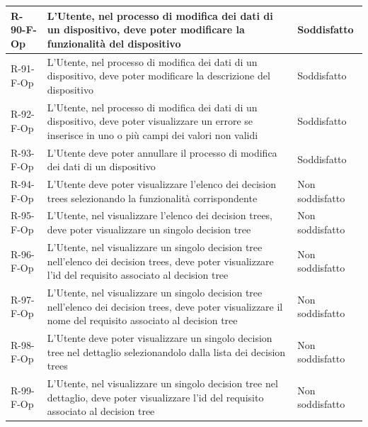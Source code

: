 \documentclass[a4paper,12pt]{article}
\begin{document}
{{\begin{longtable}{|l|p{}|p{}|}
                R-90-F-Op       & L'Utente, nel processo di modifica dei dati di un dispositivo, deve poter modificare la funzionalità del dispositivo                                                                        & Soddisfatto \\ \hline
                R-91-F-Op       & L'Utente, nel processo di modifica dei dati di un dispositivo, deve poter modificare la descrizione del dispositivo                                                                         & Soddisfatto \\ \hline
                R-92-F-Op       & L'Utente, nel processo di modifica dei dati di un dispositivo, deve poter visualizzare un errore se inserisce in uno o più campi dei valori non validi                                      & Soddisfatto \\ \hline
                R-93-F-Op       & L'Utente deve poter annullare il processo di modifica dei dati di un dispositivo                                                                                                            & Soddisfatto \\ \hline
                R-94-F-Op       & L'Utente deve poter visualizzare l'elenco dei decision trees selezionando la funzionalità corrispondente                                                                                    & Non soddisfatto \\ \hline
                R-95-F-Op       & L'Utente, nel visualizzare l'elenco dei decision trees, deve poter visualizzare un singolo decision tree                                                                                    & Non soddisfatto \\ \hline
                R-96-F-Op       & L'Utente, nel visualizzare un singolo decision tree nell'elenco dei decision trees, deve poter visualizzare l'id del requisito associato al decision tree                                   & Non soddisfatto \\ \hline
                R-97-F-Op       & L'Utente, nel visualizzare un singolo decision tree nell'elenco dei decision trees, deve poter visualizzare il nome del requisito associato al decision tree                                & Non soddisfatto \\ \hline
                R-98-F-Op       & L'Utente deve poter visualizzare un singolo decision tree nel dettaglio selezionandolo dalla lista dei decision trees                                                                       & Non soddisfatto \\ \hline
                R-99-F-Op       & L'Utente, nel visualizzare un singolo decision tree nel dettaglio, deve poter visualizzare l'id del requisito associato al decision tree                                                    & Non soddisfatto \\ \hline

\end{longtable}}}
\end{document}
